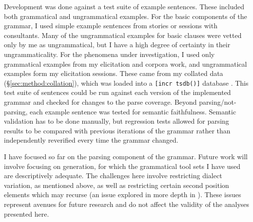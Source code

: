 
Development was done against a test suite of example sentences. These included both grammatical and ungrammatical examples. For the basic components of the grammar, I used simple example sentences from stories or sessions with consultants. Many of the ungrammatical examples for basic clauses were vetted only by me as ungrammatical, but I have a high degree of certainty in their ungrammaticality. For the phenomena under investigation, I used only grammatical examples from my elicitation and corpora work, and ungrammatical examples form my elicitation sessions. These came from my collated data (\S\ref{sec:method:collation}), which was loaded into a \texttt{[incr tsdb()]} database \citep{oepen2001}. This test suite of sentences could be run against each version of the implemented grammar and checked for changes to the parse coverage. Beyond parsing/not-parsing, each example sentence was tested for semantic faithfulness. Semantic validation has to be done manually, but regression tests allowed for parsing results to be compared with previous iterations of the grammar rather than independently reverified every time the grammar changed.

I have focused so far on the parsing component of the grammar. Future work will involve focusing on generation, for which the grammatical tool sets I have used are descriptively adequate. The challenges here involve restricting dialect variation, as mentioned above, as well as restricting certain second position elements which may recurse (an issue explored in more depth in \citealt{bender2010reweaving}). These issues represent avenues for future research and do not affect the validity of the analyses presented here.

